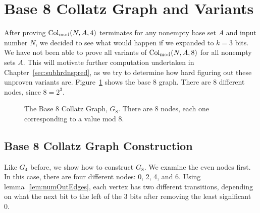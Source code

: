 \section{Base 8 Collatz Graph and Variants} \label{subsec:base8graphsubpblms}
After proving $\mathrm{Col}_{\text{mod}}(N,A,4)$ terminates for any nonempty base set $A$ and input number $N$, we decided to see what would happen if we expanded to $k = 3$ bits. We have not been able to prove all variants of $\mathrm{Col}_{\text{mod}}(N,A,8)$ for all nonempty sets $A$. This will motivate further computation undertaken in Chapter~\ref{sec:subhrdnspred}, as we try to determine how hard figuring out these unproven variants are. Figure~\ref{fig:base_8_graph} shows the base 8 graph. There are 8 different nodes, since $8 = 2^3$.
\begin{figure}
    \centering
    \caption{The Base 8 Collatz Graph, $G_8$. There are 8 nodes, each one corresponding to a value mod 8.}
    \label{fig:base_8_graph}
\end{figure}

\subsection{Base 8 Collatz Graph Construction} \label{subsubsec:base8proof}
Like $G_4$ before, we show how to construct $G_8$. We examine the even nodes first. In this case, there are four different nodes: 0, 2, 4, and 6. Using lemma~\ref{lem:numOutEdges}, each vertex has two different transitions, depending on what the next bit to the left of the 3 bits after removing the least significant 0. 


